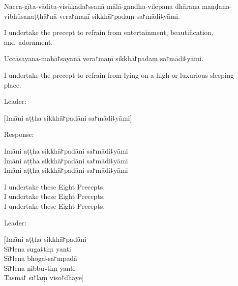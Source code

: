 \begin{precept}
  \setcounter{enumi}{6}
  \item Nacca-gīta-vādita-visūkada꜓ssanā mālā-gandha-vilepana dhāraṇa maṇḍana-vibhūsanaṭṭhā꜓nā vera꜓maṇī sikkhā꜓padaṃ sa꜓mādi꜕yāmi.
\end{precept}

\begin{english}
  I undertake the precept to refrain from entertainment, beautification, and~adornment.
\end{english}

\begin{precept}
  \setcounter{enumi}{7}
  \item Uccāsayana-mahā꜓sayanā vera꜓maṇī sikkhā꜓padaṃ sa꜓mādi꜕yāmi.
\end{precept}

\begin{english}
  I undertake the precept to refrain from lying on a high or luxurious sleeping place.
\end{english}

\begin{instruction}
  Leader:
\end{instruction}

[Imāni aṭṭha sikkhā꜓padāni sa꜓mādi꜕yāmi]

\begin{instruction}
  Response:
\end{instruction}


Imāni aṭṭha sikkhā꜓padāni sa꜓mādi꜕yāmi\\
Imāni aṭṭha sikkhā꜓padāni sa꜓mādi꜕yāmi\\
Imāni aṭṭha sikkhā꜓padāni sa꜓mādi꜕yāmi

\begin{english}
  I undertake these Eight Precepts.\\
  I undertake these Eight Precepts.\\
  I undertake these Eight Precepts.
\end{english}

\begin{instruction}
  Leader:
\end{instruction}


[Imāni aṭṭha sikkhā꜓padāni\\
Sī꜓lena suga꜕tiṃ yanti\\
Sī꜓lena bhoga꜕sa꜓mpadā\\
Sī꜓lena nibbu꜕tiṃ yanti\\
Tasmā꜓ sī꜓laṃ viso꜓dhaye]


